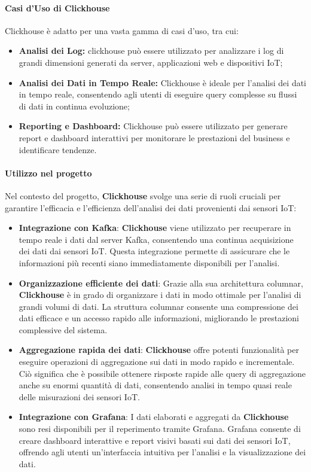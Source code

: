\paragraph{Casi d'Uso di Clickhouse}
Clickhouse è adatto per una vasta gamma di casi d'uso, tra cui:
\begin{itemize}
    \item \textbf{Analisi dei Log:} clickhouse può essere utilizzato per analizzare i log di grandi dimensioni generati da server, applicazioni web e dispositivi IoT;
    \item \textbf{Analisi dei Dati in Tempo Reale:} Clickhouse è ideale per l'analisi dei dati in tempo reale, consentendo agli utenti di eseguire query complesse su flussi di dati in continua evoluzione;
    \item \textbf{Reporting e Dashboard:} Clickhouse può essere utilizzato per generare report e dashboard interattivi per monitorare le prestazioni del business e identificare tendenze.
\end{itemize}


\paragraph{Utilizzo nel progetto}
Nel contesto del progetto, \textbf{Clickhouse} svolge una serie di ruoli cruciali per garantire l'efficacia e l'efficienza dell'analisi dei dati provenienti dai sensori IoT:

\begin{itemize}
  \item \textbf{Integrazione con Kafka}: \textbf{Clickhouse} viene utilizzato per recuperare in tempo reale i dati dal server Kafka, consentendo una continua acquisizione dei dati dai sensori IoT. Questa integrazione permette di assicurare che le informazioni più recenti siano immediatamente disponibili per l'analisi.
  
  \item \textbf{Organizzazione efficiente dei dati}: Grazie alla sua architettura columnar, \textbf{Clickhouse} è in grado di organizzare i dati in modo ottimale per l'analisi di grandi volumi di dati. La struttura columnar consente una compressione dei dati efficace e un accesso rapido alle informazioni, migliorando le prestazioni complessive del sistema.
  
  \item \textbf{Aggregazione rapida dei dati}: \textbf{Clickhouse} offre potenti funzionalità per eseguire operazioni di aggregazione sui dati in modo rapido e incrementale. Ciò significa che è possibile ottenere risposte rapide alle query di aggregazione anche su enormi quantità di dati, consentendo analisi in tempo quasi reale delle misurazioni dei sensori IoT.
  
  \item \textbf{Integrazione con Grafana}: I dati elaborati e aggregati da \textbf{Clickhouse} sono resi disponibili per il reperimento tramite Grafana. Grafana consente di creare dashboard interattive e report visivi basati sui dati dei sensori IoT, offrendo agli utenti un'interfaccia intuitiva per l'analisi e la visualizzazione dei dati.
\end{itemize}

